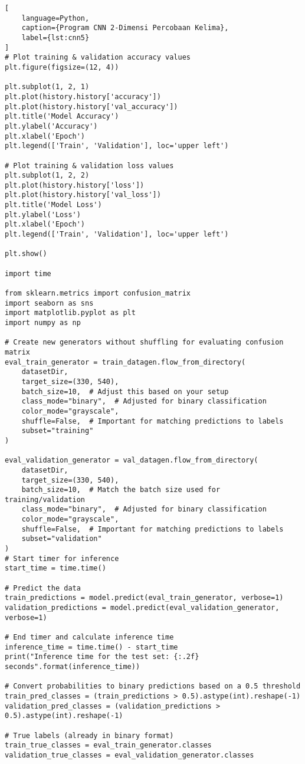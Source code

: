 \begin{lstlisting}[
    language=Python,
    caption={Program CNN 2-Dimensi Percobaan Kelima},
    label={lst:cnn5}
]
# Plot training & validation accuracy values
plt.figure(figsize=(12, 4))

plt.subplot(1, 2, 1)
plt.plot(history.history['accuracy'])
plt.plot(history.history['val_accuracy'])
plt.title('Model Accuracy')
plt.ylabel('Accuracy')
plt.xlabel('Epoch')
plt.legend(['Train', 'Validation'], loc='upper left')

# Plot training & validation loss values
plt.subplot(1, 2, 2)
plt.plot(history.history['loss'])
plt.plot(history.history['val_loss'])
plt.title('Model Loss')
plt.ylabel('Loss')
plt.xlabel('Epoch')
plt.legend(['Train', 'Validation'], loc='upper left')

plt.show()

import time

from sklearn.metrics import confusion_matrix
import seaborn as sns
import matplotlib.pyplot as plt
import numpy as np

# Create new generators without shuffling for evaluating confusion matrix
eval_train_generator = train_datagen.flow_from_directory(
    datasetDir,
    target_size=(330, 540),
    batch_size=10,  # Adjust this based on your setup
    class_mode="binary",  # Adjusted for binary classification
    color_mode="grayscale",
    shuffle=False,  # Important for matching predictions to labels
    subset="training"
)

eval_validation_generator = val_datagen.flow_from_directory(
    datasetDir,
    target_size=(330, 540),
    batch_size=10,  # Match the batch size used for training/validation
    class_mode="binary",  # Adjusted for binary classification
    color_mode="grayscale",
    shuffle=False,  # Important for matching predictions to labels
    subset="validation"
)
# Start timer for inference
start_time = time.time()

# Predict the data
train_predictions = model.predict(eval_train_generator, verbose=1)
validation_predictions = model.predict(eval_validation_generator, verbose=1)

# End timer and calculate inference time
inference_time = time.time() - start_time
print("Inference time for the test set: {:.2f} seconds".format(inference_time))

# Convert probabilities to binary predictions based on a 0.5 threshold
train_pred_classes = (train_predictions > 0.5).astype(int).reshape(-1)
validation_pred_classes = (validation_predictions > 0.5).astype(int).reshape(-1)

# True labels (already in binary format)
train_true_classes = eval_train_generator.classes
validation_true_classes = eval_validation_generator.classes


\end{lstlisting}
